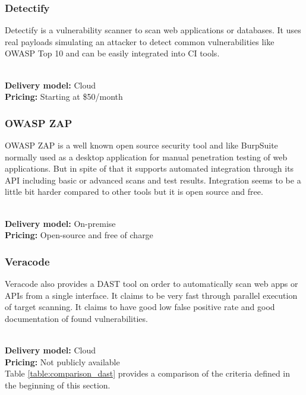 \documentclass[conference]{IEEEtran}
\begin{document}
\noindent
\subsubsection{Detectify \cite{dast5}}

Detectify is a vulnerability scanner to scan web applications or databases. It uses real payloads simulating an attacker to detect common vulnerabilities like OWASP Top 10 and can be easily integrated into CI tools.

\noindent\\
\textbf{Delivery model:} Cloud
\noindent\\
\textbf{Pricing:} Starting at \$50/month
\\

\noindent
\subsubsection{OWASP ZAP \cite{dast6}}

OWASP ZAP is a well known open source security tool and like BurpSuite normally used as a desktop application for manual penetration testing of web applications. But in spite of that it supports automated integration through its API including basic or advanced scans and test results. Integration seems to be a little bit harder compared to other tools but it is open source and free.

\noindent\\
\textbf{Delivery model:} On-premise
\noindent\\
\textbf{Pricing:} Open-source and free of charge
\\
\noindent

\subsubsection{Veracode \cite{dast7}}

Veracode also provides a DAST tool on order to automatically scan web apps or APIs from a single interface. It claims to be very fast through parallel execution of target scanning. It claims to have good low false positive rate and good documentation of found vulnerabilities.

\noindent\\
\textbf{Delivery model:} Cloud
\noindent\\
\textbf{Pricing:} Not publicly available
\\

Table \ref{table:comparison_dast} provides a comparison of the criteria defined in the beginning of this section.
\end{document}
